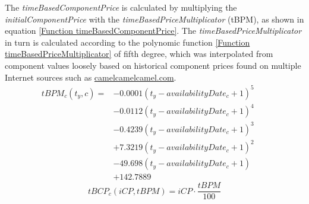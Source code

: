 The \textit{timeBasedComponentPrice} is calculated by multiplying the \textit{initialComponentPrice} with the \textit{timeBasedPriceMultiplicator} (tBPM), as shown in equation \ref{Function timeBasedComponentPrice}. The \textit{timeBasedPriceMultiplicator} in turn is calculated according to the polynomic function \ref{Function timeBasedPriceMultiplicator} of fifth degree, which was interpolated from component values loosely based on historical component prices found on multiple Internet sources such as \href{https://camelcamelcamel.com}{camelcamelcamel.com}.
\begin{equation}
\label{Function timeBasedPriceMultiplicator}
\begin{aligned}
   tBPM_{c}(t_y, c) = & - 0.0001(t_y-availabilityDate_{c}+1)^5 \\
   & - 0.0112(t_y-availabilityDate_{c}+1)^4 \\
   & - 0.4239(t_y-availabilityDate_{c}+1)^3 \\
   & + 7.3219(t_y-availabilityDate_{c}+1)^2 \\
   & - 49.698(t_y-availabilityDate_{c}+1) \\
   & + 142.7889 &&
\end{aligned}   
\end{equation}
\begin{equation}
\label{Function timeBasedComponentPrice}
    tBCP_{c} (iCP, tBPM) = iCP \cdot \dfrac{tBPM}{100}
\end{equation}

